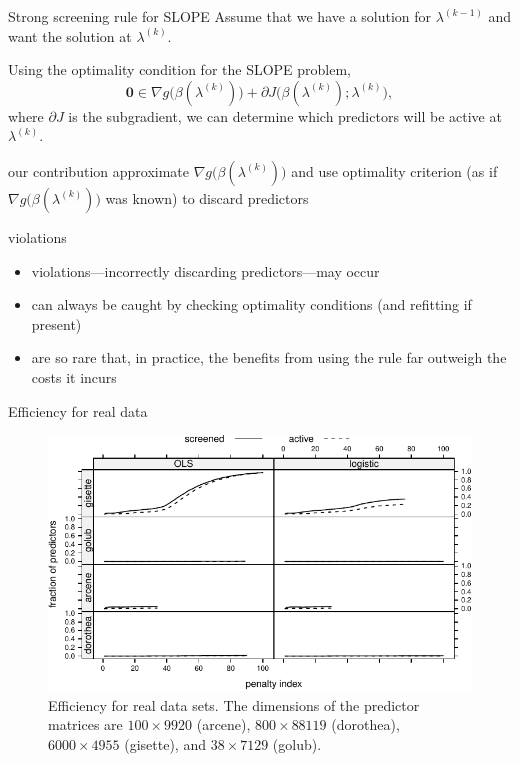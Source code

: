 \documentclass[10pt,ignorenonframetext]{beamer}
\begin{document}
\begin{frame}{Strong screening rule for SLOPE}
    Assume that we have a solution for \(\lambda^{(k-1)}\) and want
    the solution at \(\lambda^{(k)}\).\medskip
    
    Using the optimality condition for the SLOPE problem,
    \[ \textbf{0} \in \nabla g\big(\beta(\lambda^{(k)})\big) + \partial J\big(\beta(\lambda^{(k)});\lambda^{(k)}\big),\]
    where \(\partial J\) is the subgradient, we can determine which predictors will be active at \(\lambda^{(k)}\).

    \pause
    \begin{block}{our contribution}
        approximate \(\nabla g\big(\beta(\lambda^{(k)})\big) \) and use optimality
        criterion (as if \(\nabla g\big(\beta(\lambda^{(k)})\big) \) was known) to discard predictors
    \end{block}
    \pause
    \begin{block}{violations}
        \begin{itemize}
            \item violations---incorrectly discarding predictors---may occur
            \item can always be caught by checking optimality conditions (and refitting if present)
            \item are \alert{so rare} that, in practice, the benefits from using the rule far outweigh the costs it incurs
        \end{itemize}
    \end{block}
\end{frame}

\begin{frame}{Efficiency for real data}
\begin{figure}
\centering
\includegraphics[width=\linewidth]{figures/efficiency-real.pdf}
\caption{Efficiency for real data sets. The dimensions of the predictor matrices
are \(100 \times 9920\) (arcene), \(800\times 88119\) (dorothea), \(6000\times 4955\)
(gisette), and \(38 \times 7129\) (golub).}
\end{figure}
\end{frame}
\end{document}
